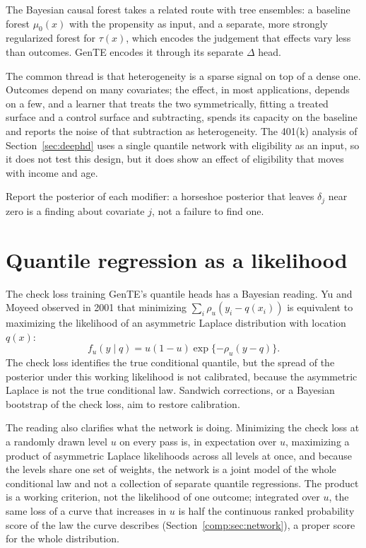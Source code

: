 The Bayesian causal forest takes a related route with tree ensembles: a baseline forest $\mu_0(x)$ with the propensity as input, and a separate, more strongly regularized forest for $\tau(x)$, which encodes the judgement that effects vary less than outcomes. GenTE encodes it through its separate $\Delta$ head.

The common thread is that heterogeneity is a sparse signal on top of a dense one. Outcomes depend on many covariates; the effect, in most applications, depends on a few, and a learner that treats the two symmetrically, fitting a treated surface and a control surface and subtracting, spends its capacity on the baseline and reports the noise of that subtraction as heterogeneity. The 401(k) analysis of Section~\ref{sec:deephd} uses a single quantile network with eligibility as an input, so it does not test this design, but it does show an effect of eligibility that moves with income and age.

Report the posterior of each modifier: a horseshoe posterior that leaves $\delta_j$ near zero is a finding about covariate $j$, not a failure to find one.

\section{Quantile regression as a likelihood}

The check loss training GenTE's quantile heads has a Bayesian reading. Yu and Moyeed observed in 2001 that minimizing $\sum_i \rho_u(y_i - q(x_i))$ is equivalent to maximizing the likelihood of an asymmetric Laplace distribution with location $q(x)$:
\[
f_u(y \mid q) = u(1 - u)\exp\{-\rho_u(y - q)\}.
\]
The check loss identifies the true conditional quantile, but the spread of the posterior under this working likelihood is not calibrated, because the asymmetric Laplace is not the true conditional law. Sandwich corrections, or a Bayesian bootstrap of the check loss, aim to restore calibration. 

The reading also clarifies what the network is doing. Minimizing the check loss at a randomly drawn level $u$ on every pass is, in expectation over $u$, maximizing a product of asymmetric Laplace likelihoods across all levels at once, and because the levels share one set of weights, the network is a joint model of the whole conditional law and not a collection of separate quantile regressions. The product is a working criterion, not the likelihood of one outcome; integrated over $u$, the same loss of a curve that increases in $u$ is half the continuous ranked probability score of the law the curve describes (Section~\ref{comp:sec:network}), a proper score for the whole distribution.

